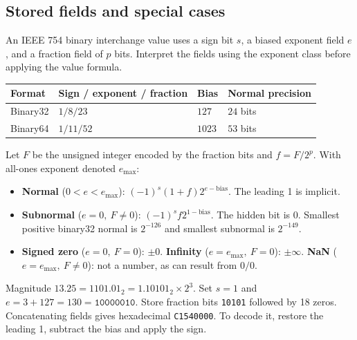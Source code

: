 \documentclass[12pt,a4paper]{article}
\begin{document}
\subsection{Stored fields and special cases}
\begin{tcolorbox}[defbox,title={Binary floating-point format}]
An IEEE 754 binary interchange value uses a sign bit $s$, a biased exponent field $e$, and a fraction field of $p$ bits. Interpret the fields using the exponent class before applying the value formula.
\end{tcolorbox}
\par\vspace{6pt}\noindent
\begin{tabularx}{\linewidth}{|B{3cm}|Y|Y|Y|}\hline
Format & Sign / exponent / fraction & Bias & Normal precision \\ \hline
Binary32 & $1/8/23$ & $127$ & $24$ bits \\ \hline
Binary64 & $1/11/52$ & $1023$ & $53$ bits \\ \hline
\end{tabularx}

Let $F$ be the unsigned integer encoded by the fraction bits and $f=F/2^p$. With all-ones exponent denoted $e_{\max}$:
\begin{itemize}[leftmargin=*,itemsep=3pt]
\item \textbf{Normal} ($0<e<e_{\max}$): $(-1)^s(1+f)2^{e-\mathrm{bias}}$. The leading 1 is implicit.
\item \textbf{Subnormal} ($e=0,\ F\ne0$): $(-1)^s f2^{1-\mathrm{bias}}$. The hidden bit is 0. Smallest positive binary32 normal is $2^{-126}$ and smallest subnormal is $2^{-149}$.
\item \textbf{Signed zero} ($e=0,\ F=0$): $\pm0$. \textbf{Infinity} ($e=e_{\max},\ F=0$): $\pm\infty$. \textbf{NaN} ($e=e_{\max},\ F\ne0$): not a number, as can result from $0/0$.
\end{itemize}
\begin{tcolorbox}[examplebox,title={Encode negative 13.25 in binary32}]
Magnitude $13.25=1101.01_2=1.10101_2\times2^3$. Set $s=1$ and $e=3+127=130=\texttt{10000010}$. Store fraction bits \texttt{10101} followed by 18 zeros. Concatenating fields gives hexadecimal \texttt{C1540000}. To decode it, restore the leading 1, subtract the bias and apply the sign.
\end{tcolorbox}
\end{document}
